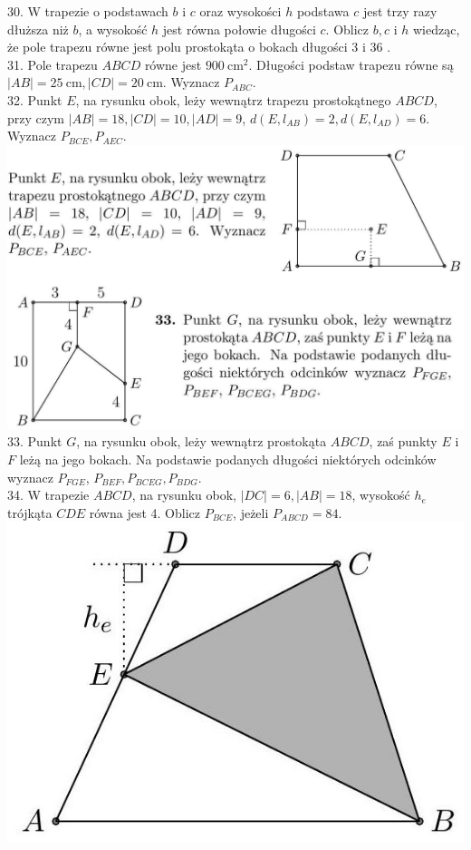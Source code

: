 \documentclass[10pt]{article}
\begin{document}
30. W trapezie o podstawach \(b\) i \(c\) oraz wysokości \(h\) podstawa \(c\) jest trzy razy dłuższa niż \(b\), a wysokość \(h\) jest równa połowie długości \(c\). Oblicz \(b, c\) i \(h\) wiedząc, że pole trapezu równe jest polu prostokąta o bokach długości 3 i 36 .\\
31. Pole trapezu \(A B C D\) równe jest \(900 \mathrm{~cm}^{2}\). Długości podstaw trapezu równe są \(|A B|=25 \mathrm{~cm},|C D|=20 \mathrm{~cm}\). Wyznacz \(P_{A B C}\).\\
32. Punkt \(E\), na rysunku obok, leży wewnątrz trapezu prostokątnego \(A B C D\), przy czym \(|A B|=18,|C D|=10,|A D|=9\), \(d\left(E, l_{A B}\right)=2, d\left(E, l_{A D}\right)=6\). Wyznacz \(P_{B C E}, P_{A E C}\).\\
\includegraphics[max width=\textwidth, center]{2024_11_21_71f62bd117d375398909g-038(2)}\\
33. Punkt \(G\), na rysunku obok, leży wewnątrz prostokąta \(A B C D\), zaś punkty \(E\) i \(F\) leżą na jego bokach. Na podstawie podanych długości niektórych odcinków wyznacz \(P_{F G E}\), \(P_{B E F}, P_{B C E G}, P_{B D G}\).\\
34. W trapezie \(A B C D\), na rysunku obok, \(|D C|=6,|A B|=18\), wysokość \(h_{e}\) trójkąta \(C D E\) równa jest 4. Oblicz \(P_{B C E}\), jeżeli \(P_{A B C D}=84\).\\
\includegraphics[max width=\textwidth, center]{2024_11_21_71f62bd117d375398909g-038(1)}\\
\end{document}

